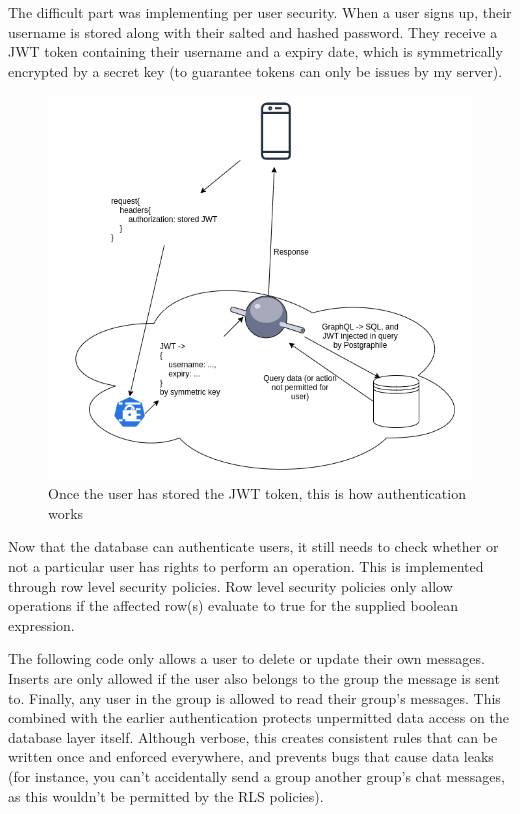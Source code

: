 \documentclass{l4proj}
\begin{document}
The difficult part was implementing per user security. When a user signs up, their username is stored along with their salted and hashed password. They receive a JWT token containing their username and a expiry date, which is symmetrically encrypted by a secret key (to guarantee tokens can only be issues by my server). 
\begin{figure}[H]
    \centering
    \includegraphics[width=1.0\linewidth]{authentication.png}    
    \caption{
  Once the user has stored the JWT token, this is how authentication works
    }
\end{figure}

Now that the database can authenticate users, it still needs to check whether or not a particular user has rights to perform an operation. This is implemented through row level security policies. Row level security policies only allow operations if the affected row(s) evaluate to true for the supplied boolean expression.

The following code only allows a user to delete or update their own messages. Inserts are only allowed if the user also belongs to the group the message is sent to. Finally, any user in the group is allowed to read their group's messages. This combined with the earlier authentication protects unpermitted data access on the database layer itself. Although verbose, this creates consistent rules that can be written once and enforced everywhere, and prevents bugs that cause data leaks (for instance, you can't accidentally send a group another group's chat messages, as this wouldn't be permitted by the RLS policies).
\end{document}
